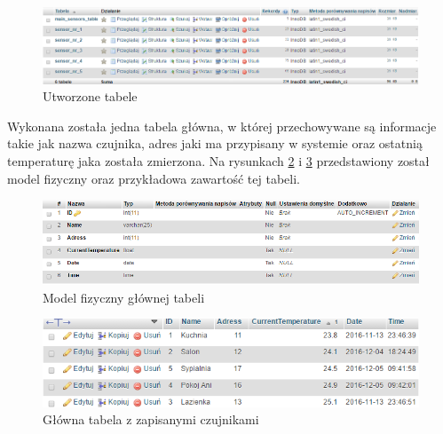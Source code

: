 \documentclass[eng,printmode,openright]{mgr} %
\begin{document}
\begin{enumerate}
\begin{itemize}
		\begin{figure}[H]
			\centering
			\includegraphics[width=1\linewidth]{BazaDanych1.png}
			\caption{Utworzone tabele}
			\label{tabele}
		\end{figure}
		
		Wykonana została jedna tabela główna, w której przechowywane są informacje takie jak nazwa czujnika, adres jaki ma przypisany w systemie oraz ostatnią temperaturę jaka została zmierzona.
		Na rysunkach \ref{model_fizyczny_main} i \ref{main_table} przedstawiony został model fizyczny oraz przykładowa zawartość tej tabeli. 
		
		\begin{figure}[H]
			\centering
			\includegraphics[width=1\linewidth]{BazaDanych5.png}
			\caption{Model fizyczny głównej tabeli}
			\label{model_fizyczny_main}
		\end{figure}			
		\begin{figure}[H]
			\centering
			\includegraphics[width=1\linewidth]{BazaDanych2.png}
			\caption{Główna tabela z zapisanymi czujnikami}
			\label{main_table}
		\end{figure}
		

\end{itemize}
\end{enumerate}
\end{document}
